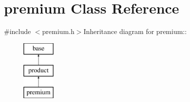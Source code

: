 \hypertarget{classpremium}{
\section{premium Class Reference}
\label{classpremium}
}


{\ttfamily \#include $<$premium.h$>$}Inheritance diagram for premium::\begin{figure}[H]
\begin{center}
\leavevmode
\includegraphics[height=3cm]{classpremium}
\end{center}
\end{figure}

